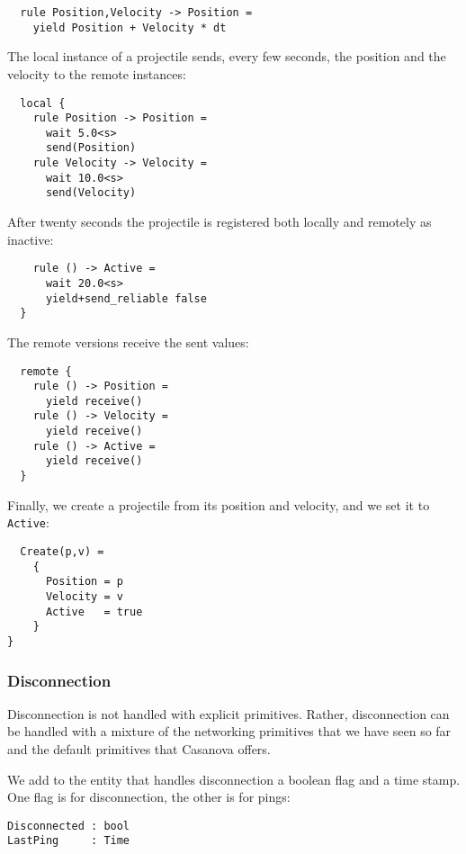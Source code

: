 \begin{lstlisting}
  rule Position,Velocity -> Position = 
    yield Position + Velocity * dt
\end{lstlisting}

The local instance of a projectile sends, every few seconds, the position and the velocity to the remote instances:

\begin{lstlisting}
  local {
    rule Position -> Position =
      wait 5.0<s>
      send(Position)
    rule Velocity -> Velocity =
      wait 10.0<s>
      send(Velocity)
\end{lstlisting}

After twenty seconds the projectile is registered both locally and remotely as inactive:

\begin{lstlisting}
    rule () -> Active =
      wait 20.0<s>
      yield+send_reliable false
  }
\end{lstlisting}

The remote versions receive the sent values:

\begin{lstlisting}
  remote {
    rule () -> Position = 
      yield receive()
    rule () -> Velocity =
      yield receive()
    rule () -> Active =
      yield receive()
  }
\end{lstlisting}

Finally, we create a projectile from its position and velocity, and we set it to \texttt{Active}:

\begin{lstlisting}
  Create(p,v) =
    {
      Position = p
      Velocity = v
      Active   = true
    }
}
\end{lstlisting}


\subsubsection{Disconnection}
Disconnection is not handled with explicit primitives. Rather, disconnection can be handled with a mixture of the networking primitives that we have seen so far and the default primitives that Casanova offers.

We add to the entity that handles disconnection a boolean flag and a time stamp. One flag is for disconnection, the other is for pings:

\begin{lstlisting}
Disconnected : bool
LastPing     : Time
\end{lstlisting}

